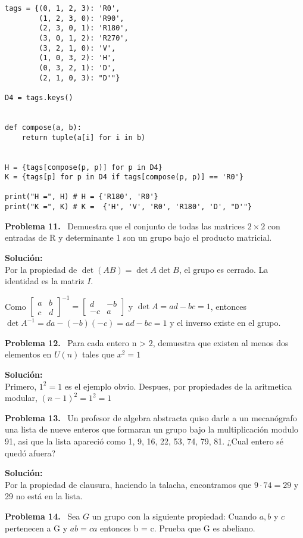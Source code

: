 \documentclass{article}
\newcounter{problem}
\newcounter{solution}
\newcommand\Problem[1]{%
  \stepcounter{problem}%
  \textbf{Problema #1.}~%
  \setcounter{solution}{0}%
}
\newcommand\TheSolution{%
  \textbf{Solución:}\\%
}
\begin{document}
\begin{lstlisting}
tags = {(0, 1, 2, 3): 'R0',
        (1, 2, 3, 0): 'R90',
        (2, 3, 0, 1): 'R180',
        (3, 0, 1, 2): 'R270',
        (3, 2, 1, 0): 'V',
        (1, 0, 3, 2): 'H',
        (0, 3, 2, 1): 'D',
        (2, 1, 0, 3): "D'"}

D4 = tags.keys()


def compose(a, b):
    return tuple(a[i] for i in b)


H = {tags[compose(p, p)] for p in D4}
K = {tags[p] for p in D4 if tags[compose(p, p)] == 'R0'}

print("H =", H) # H = {'R180', 'R0'}
print("K =", K) # K =  {'H', 'V', 'R0', 'R180', 'D', "D'"}
\end{lstlisting}

\Problem{11} Demuestra que el conjunto de todas las matrices $2 \times 2$ con
entradas de R y determinante 1 son un grupo bajo el producto matricial.

\TheSolution{}
Por la propiedad de $\det {(AB)} = \det A \det B$, el grupo es cerrado. La
identidad es la matriz $I$.

Como $\begin{bmatrix}a&b\\c&d\end{bmatrix}^{-1} = \begin{bmatrix}d&-b\\-c&a
\end{bmatrix}$ y $\det A = ad - bc = 1$, entonces $\det A^{-1} = da -
(-b)(-c) = ad - bc = 1$ y el inverso existe en el grupo.

\Problem{12} Para cada entero n > 2, demuestra que existen al menos dos
elementos en $U(n)$ tales que $x^2 = 1$

\TheSolution{}
Primero, $1^2 = 1$ es el ejemplo obvio. Despues, por propiedades de la
aritmetica modular, ${(n - 1)}^2 = 1^2 = 1$

\Problem{13} Un profesor de algebra abstracta quiso darle a un mecanógrafo una
lista de nueve enteros que formaran un grupo bajo la multiplicación modulo 91,
asi que la lista apareció como 1, 9, 16, 22, 53, 74, 79, 81. ¿Cual entero sé
quedó afuera?

\TheSolution{}
Por la propiedad de clausura, haciendo la talacha, encontramos que $9 · 74 =
29$ y 29 no está en la lista.

\Problem{14} Sea $G$ un grupo con la siguiente propiedad: Cuando $a, b$ y $c$
pertenecen a G y $ab = ca$ entonces b = c. Prueba que G es abeliano.
\end{document}
